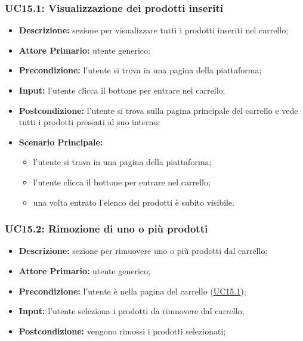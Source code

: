         \subsubsection{UC15.1: Visualizzazione dei prodotti inseriti}
        \label{sec:UC15.1}
        \begin{itemize}
            \item \textbf{Descrizione:} sezione per visualizzare tutti i prodotti inseriti nel carrello;
            \item \textbf{Attore Primario:} utente generico;
            \item \textbf{Precondizione:}  l'utente si trova in una pagina della piattaforma;
            \item \textbf{Input:} l'utente clicca il bottone per entrare nel carrello;
            \item \textbf{Postcondizione:} l'utente si trova sulla pagina principale del carrello e vede tutti i prodotti presenti al suo interno;
            \item \textbf{Scenario Principale:}
                \begin{itemize}
                    \item l'utente si trova in una pagina della piattaforma;
                    \item l'utente clicca il bottone per entrare nel carrello;
                    \item una volta entrato l'elenco dei prodotti è subito visibile.
                \end{itemize}
        \end{itemize}
        \subsubsection{UC15.2: Rimozione di uno o più prodotti}
        \begin{itemize}
            \item \textbf{Descrizione:} sezione per rimuovere uno o più prodotti dal carrello;
            \item \textbf{Attore Primario:} utente generico;
            \item \textbf{Precondizione:} l'utente è nella pagina del carrello (\hyperref[sec:UC15.1]{UC15.1});
            \item \textbf{Input:} l'utente seleziona i prodotti da rimuovere dal carrello;
            \item \textbf{Postcondizione:} vengono rimossi i prodotti selezionati;
        \end{itemize}
